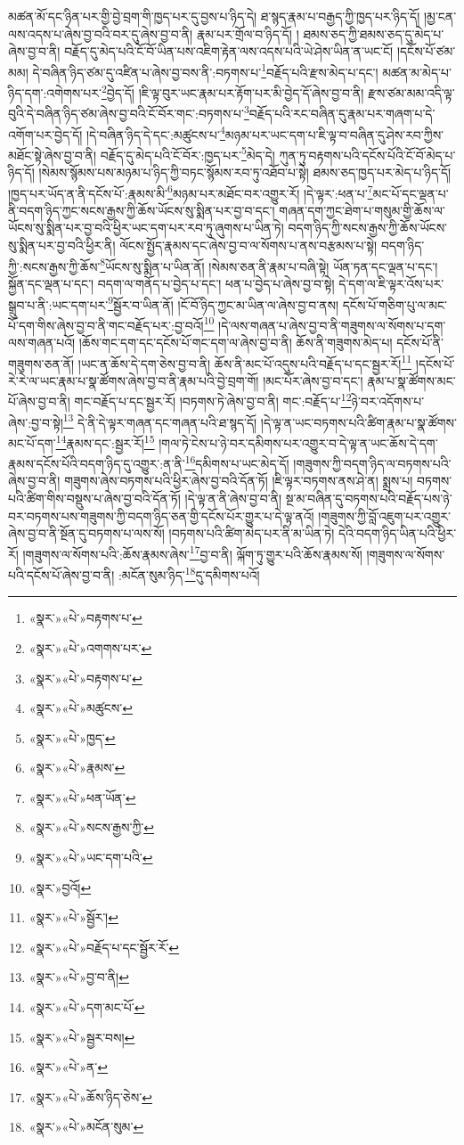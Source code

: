 མཚན་མོ་དང་ཉིན་པར་གྱི་བྱེ་བྲག་གི་ཁྱད་པར་དུ་བྱས་པ་ཉིད་དེ། ཐ་སྙད་རྣམ་པ་བརྒྱད་ཀྱི་ཁྱད་པར་ཉིད་དོ། །མྱ་ངན་ལས་འདས་པ་ཞེས་བྱ་བའི་བར་དུ་ཞེས་བྱ་བ་ནི། རྣམ་པར་གྲོལ་བ་ཉིད་དོ། །
ཐམས་ཅད་ཀྱི་ཐམས་ཅད་དུ་མེད་པ་ཞེས་བྱ་བ་ནི། བརྗོད་དུ་མེད་པའི་ངོ་བོ་ཡིན་པས་འཇིག་རྟེན་ལས་འདས་པའི་ཡེ་ཤེས་ཡིན་ན་ཡང་ངོ། །དངོས་པོ་ཙམ་མམ། དེ་བཞིན་ཉིད་ཙམ་དུ་འཛིན་པ་ཞེས་བྱ་བས་ནི་:བཏགས་པ་\footnote{«སྣར་»«པེ་»བརྟགས་པ་}བརྗོད་པའི་རྫས་མེད་པ་དང་། མཚན་མ་མེད་པ་ཉིད་དག་:འགེགས་པར་\footnote{«སྣར་»«པེ་»འགགས་པར་}བྱེད་དོ། །ཇི་ལྟ་བུར་ཡང་རྣམ་པར་རྟོག་པར་མི་བྱེད་དོ་ཞེས་བྱ་བ་ནི། རྫས་ཙམ་མམ་འདི་ལྟ་བུའི་དེ་བཞིན་ཉིད་ཙམ་ཞེས་བྱ་བའི་ངོ་བོར་གང་:བཏགས་པ་\footnote{«སྣར་»«པེ་»བརྟགས་པ་}བརྗོད་པའི་རང་བཞིན་དུ་རྣམ་པར་གཞག་པ་དེ་འགོག་པར་བྱེད་དོ། །དེ་བཞིན་ཉིད་དེ་དང་:མཚུངས་པ་\footnote{«སྣར་»«པེ་»མཚུངས་}མཉམ་པར་ཡང་དག་པ་ཇི་ལྟ་བ་བཞིན་དུ་ཤེས་རབ་ཀྱིས་མཐོང་སྟེ་ཞེས་བྱ་བ་ནི། བརྗོད་དུ་མེད་པའི་ངོ་བོར་:ཁྱད་པར་\footnote{«སྣར་»«པེ་»ཁྱད་}མེད་དེ། ཀུན་ཏུ་བརྟགས་པའི་དངོས་པོའི་ངོ་བོ་མེད་པ་ཉིད་དོ། །སེམས་སྙོམས་པས་མཉམ་པ་ཉིད་ཀྱི་བཏང་སྙོམས་རབ་ཏུ་འཐོབ་པ་སྟེ། ཐམས་ཅད་ཁྱད་པར་མེད་པ་ཉིད་དོ། །ཁྱད་པར་ཡོད་ན་ནི་དངོས་པོ་:རྣམས་མི་\footnote{«སྣར་»«པེ་»རྣམས་}མཉམ་པར་མཐོང་བར་འགྱུར་རོ། །དེ་ལྟར་:ཕན་པ་\footnote{«སྣར་»«པེ་»ཕན་ཡོན་}མང་པོ་དང་ལྡན་པ་ནི་བདག་ཉིད་ཀྱང་སངས་རྒྱས་ཀྱི་ཆོས་ཡོངས་སུ་སྨིན་པར་བྱ་བ་དང་། གཞན་དག་ཀྱང་ཐེག་པ་གསུམ་གྱི་ཆོས་ལ་ཡོངས་སུ་སྨིན་པར་བྱ་བའི་ཕྱིར་ཡང་དག་པར་རབ་ཏུ་ཞུགས་པ་ཡིན་ཏེ། བདག་ཉིད་ཀྱི་སངས་རྒྱས་ཀྱི་ཆོས་ཡོངས་སུ་སྨིན་པར་བྱ་བའི་ཕྱིར་ནི། ལོངས་སྤྱོད་རྣམས་དང་ཞེས་བྱ་བ་ལ་སོགས་པ་ནས་བརྩམས་པ་སྟེ། བདག་ཉིད་ཀྱི་:སངས་རྒྱས་ཀྱི་ཆོས་\footnote{«སྣར་»«པེ་»སངས་རྒྱས་ཀྱི་}ཡོངས་སུ་སྨིན་པ་ཡིན་ནོ། །སེམས་ཅན་ནི་རྣམ་པ་བཞི་སྟེ། ཡོན་ཏན་དང་ལྡན་པ་དང་། སྐྱོན་དང་ལྡན་པ་དང་། བདག་ལ་གནོད་པ་བྱེད་པ་དང་། ཕན་པ་བྱེད་པ་ཞེས་བྱ་བ་སྟེ། དེ་དག་ལ་ཇི་ལྟར་འོས་པར་སྒྲུབ་པ་ནི་:ཡང་དག་པར་\footnote{«སྣར་»«པེ་»ཡང་དག་པའི་}སྦྱོར་བ་ཡིན་ནོ། །ངོ་བོ་ཉིད་ཀྱང་མ་ཡིན་ལ་ཞེས་བྱ་བ་ནས། དངོས་པོ་གཅིག་པུ་ལ་མང་པོ་དག་གིས་ཞེས་བྱ་བ་ནི་གང་བརྗོད་པར་:བྱ་བའོ།\footnote{«སྣར་»བྱའོ།} །དེ་ལས་གཞན་པ་ཞེས་བྱ་བ་ནི་གཟུགས་ལ་སོགས་པ་དག་ལས་གཞན་པའོ། །ཆོས་གང་དག་དང་དངོས་པོ་གང་དག་ལ་ཞེས་བྱ་བ་ནི། ཆོས་ནི་གཟུགས་མེད་པ། དངོས་པོ་ནི་གཟུགས་ཅན་ནོ། །ཡང་ན་ཆོས་དེ་དག་ཅེས་བྱ་བ་ནི། ཆོས་ནི་མང་པོ་འདུས་པའི་བརྗོད་པ་དང་སྦྱར་རོ།\footnote{«སྣར་»«པེ་»སྦྱོར་།} །དངོས་པོ་རེ་རེ་ལ་ཡང་རྣམ་པ་སྣ་ཚོགས་ཞེས་བྱ་བ་ནི་རྣམ་པའི་བྱེ་བྲག་གོ། །མང་པོར་ཞེས་བྱ་བ་དང་། རྣམ་པ་སྣ་ཚོགས་མང་པོ་ཞེས་བྱ་བ་ནི། གང་བརྗོད་པ་དང་སྦྱར་རོ། །བཏགས་ཏེ་ཞེས་བྱ་བ་ནི། གང་:བརྗོད་པ་\footnote{«སྣར་»«པེ་»བརྗོད་པ་དང་སྦྱོར་རོ་}ཉེ་བར་འདོགས་པ་ཞེས་:བྱ་བ་སྟེ།\footnote{«སྣར་»«པེ་»བྱ་བ་ནི།} དེ་ནི་དེ་ལྟར་གཞན་དང་གཞན་པའི་ཐ་སྙད་དོ། །དེ་ལྟ་ན་ཡང་བཏགས་པའི་ཚིག་རྣམ་པ་སྣ་ཚོགས་མང་པོ་དག་\footnote{«སྣར་»«པེ་»དག་མང་པོ་}རྣམས་དང་:སྦྱར་རོ།\footnote{«སྣར་»«པེ་»སྦྱར་བས།} །གལ་ཏེ་ངེས་པ་ཉེ་བར་དམིགས་པར་འགྱུར་བ་དེ་ལྟ་ན་ཡང་ཆོས་དེ་དག་རྣམས་དངོས་པོའི་བདག་ཉིད་དུ་འགྱུར་:ན་ནི་\footnote{«སྣར་»«པེ་»ན་}དམིགས་པ་ཡང་མེད་དོ། །གཟུགས་ཀྱི་བདག་ཉིད་ལ་བཏགས་པའི་ཞེས་བྱ་བ་ནི། གཟུགས་ཞེས་བཏགས་པའི་ཕྱིར་ཞེས་བྱ་བའི་དོན་ཏོ། །ཇི་ལྟར་བཏགས་ནས་ཤེ་ན། སྨྲས་པ། བཏགས་པའི་ཚིག་གིས་བསྡུས་པ་ཞེས་བྱ་བའི་དོན་ཏོ། །དེ་ལྟ་ན་ནི་ཞེས་བྱ་བ་ནི། སྔ་མ་བཞིན་དུ་བཏགས་པའི་བརྗོད་པས་ཉེ་བར་བཏགས་པས་གཟུགས་ཀྱི་བདག་ཉིད་ཅན་གྱི་དངོས་པོར་གྱུར་པ་དེ་ལྟ་ནའོ། །གཟུགས་ཀྱི་བློ་འཇུག་པར་འགྱུར་ཞེས་བྱ་བ་ནི་སྔོན་དུ་བཏགས་པ་ལས་སོ། །བཏགས་པའི་ཚིག་མེད་པར་ནི་མ་ཡིན་ཏེ། དེའི་བདག་ཉིད་ཡིན་པའི་ཕྱིར་རོ། །གཟུགས་ལ་སོགས་པའི་:ཆོས་རྣམས་ཞེས་\footnote{«སྣར་»«པེ་»ཆོས་ཉིད་ཅེས་}བྱ་བ་ནི། ལྐོག་ཏུ་གྱུར་པའི་ཆོས་རྣམས་སོ། །གཟུགས་ལ་སོགས་པའི་དངོས་པོ་ཞེས་བྱ་བ་ནི། :མངོན་སུམ་ཉིད་\footnote{«སྣར་»«པེ་»མངོན་སུམ་}དུ་དམིགས་པའོ། 